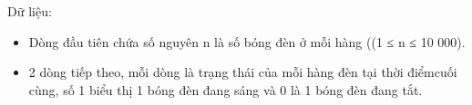 Dữ liệu:  
\begin{itemize}
	\item     Dòng đầu tiên chứa số nguyên n là số bóng đèn ở mỗi hàng ((1 ≤ n ≤ 10 000).   
	\item     2 dòng tiếp theo, mỗi dòng là trạng thái của mỗi hàng đèn tại thời điểmcuối cùng, số 1 biểu thị 1 bóng đèn đang sáng và 0 là 1 bóng đèn đang tắt.   
\end{itemize}